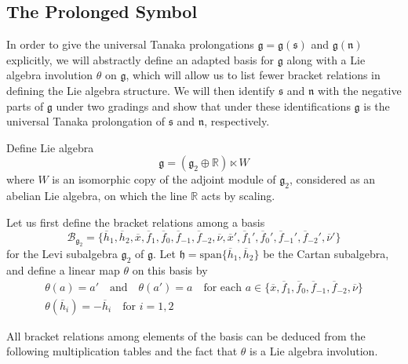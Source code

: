 \documentclass[11pt,letterpaper]{amsart}
\numberwithin{equation}{section}
\newcommand{\oline}{\overline}
\begin{document}
\subsection{The Prolonged Symbol}
\label{subsection: prol symb}
In order to give the universal Tanaka prolongations $\mathfrak{g} = \mathfrak{g}(\mathfrak s)$ and $\mathfrak g(\mathfrak n)$ explicitly, we will abstractly define an adapted basis for $\mathfrak{g}$ along with a Lie algebra involution $\theta$ on $\mathfrak{g}$, which will allow us to list fewer bracket relations in defining the Lie algebra structure. We will then identify $\mathfrak s$ and $\mathfrak n$ with the negative parts of $\mathfrak{g}$ under two gradings and show that under these identifications $\mathfrak{g}$ is the universal Tanaka prolongation of $\mathfrak s$ and $\mathfrak n$, respectively.

Define Lie algebra
\begin{equation}
    \label{def g}
    \mathfrak{g} = (\mathfrak{g}_2\oplus \mathbb{R})\ltimes W
\end{equation}
where $W$ is an isomorphic copy of the adjoint module of $\mathfrak g_2$, considered as an abelian Lie algebra, on which the line $\mathbb R$ acts by scaling.

Let us first define the bracket relations among a basis 
\begin{equation}
    \mathcal{B}_{\mathfrak{g}_2}=\{\oline{h}_1,\oline{h}_2,\oline{x},\oline{f}_1,\oline{f}_0,\oline{f}_{-1},\oline{f}_{-2},\oline{\nu},\oline{x}',\oline{f}_1',\oline{f}_0',\oline{f}_{-1}',\oline{f}_{-2}',\oline{\nu}'\}
\end{equation}
for the Levi subalgebra $\mathfrak{g}_2$ of $\mathfrak{g}$. Let $\mathfrak{h} = \mathrm{span}\{\oline{h}_1,\oline{h}_2\}$ be the Cartan subalgebra, and define a linear map $\theta$ on this basis by
\begin{gather}
    \label{def theta}
    \theta(a) = a'\quad\text{and}\quad \theta(a') = a \quad\text{for each }a\in \{\oline{x},\oline{f}_1,\oline{f}_0,\oline{f}_{-1},\oline{f}_{-2},\oline{\nu}\}
    \\
    \theta(\oline{h}_i)=-\oline{h}_i\quad \text{for }i=1,2
\end{gather}

All bracket relations among elements of the basis can be deduced from the following multiplication tables and the fact that $\theta$ is a Lie algebra involution.


 
\end{document}
